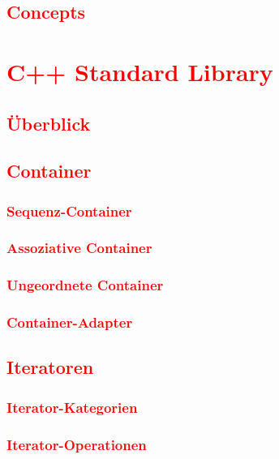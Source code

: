\section{\textcolor{red}{Concepts}}\label{sec:concepts}

\cleardoublepage\chapter{\textcolor{red}{C++ Standard Library}}\label{chap:standard-library}
\section{\textcolor{red}{Überblick}}\label{sec:std-lib-overview}
\section{\textcolor{red}{Container}}\label{sec:std-containers}
\subsection{\textcolor{red}{Sequenz-Container}}\label{sec:sequence-containers}
\subsection{\textcolor{red}{Assoziative Container}}\label{sec:associative-containers}
\subsection{\textcolor{red}{Ungeordnete Container}}\label{sec:unordered-containers}
\subsection{\textcolor{red}{Container-Adapter}}\label{sec:container-adapters}
\section{\textcolor{red}{Iteratoren}}\label{sec:iterators}
\subsection{\textcolor{red}{Iterator-Kategorien}}\label{sec:iterator-categories}
\subsection{\textcolor{red}{Iterator-Operationen}}\label{sec:iterator-operations}
